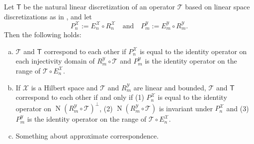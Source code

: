 \documentclass[a4paper]{paper}
\newcommand{\VecSpace}[1]{\mathscr{#1}}
\newcommand{\Op}[1]{\mathcal{#1}}
\newcommand{\DiscOp}[1]{\mathsf{#1}}
\newcommand*{\EXT}[2]{\ensuremath{E_{#1}^{#2}}}
\newcommand*{\REST}[2]{\ensuremath{R_{#1}^{#2}}}
\newcommand*{\PROJ}[2]{\ensuremath{P_{#1}^{#2}}}
\newcommand*{\RnX}{\ensuremath{\REST{n}{\VecSpace{X}}}}
\newcommand*{\RmY}{\ensuremath{\REST{m}{\VecSpace{Y}}}}
\newcommand*{\EnX}{\ensuremath{\EXT{n}{\VecSpace{X}}}}
\newcommand*{\EmY}{\ensuremath{\EXT{m}{\VecSpace{Y}}}}
\newcommand*{\PnX}{\ensuremath{\PROJ{n}{\VecSpace{X}}}}
\newcommand*{\PmY}{\ensuremath{\PROJ{m}{\VecSpace{Y}}}}
\DeclareMathOperator{\nullspace}{N}
\begin{document}
\begin{lemma}
 \label{lemma:nat_op_discr_fulfills_corresp}
 Let $\DiscOp{T}$ be the natural linear discretization of an operator $\Op{T}$ based on linear space discretizations as in 
 , and let
 \begin{equation*}
  \PnX := \EnX \circ \RnX \quad \text{and} \quad \PmY := \EmY \circ \RmY.
 \end{equation*}
 Then the following holds:
 
 \begin{enumerate}[(a)]
  \item \label{lemma:nat_op_discr_fulfills_corresp:a_general}
  $\Op{T}$ and $\DiscOp{T}$ correspond to each other if $\PnX$ is equal to the identity operator on each
  injectivity domain of $\RmY \circ \Op{T}$ and $\PmY$ is the identity operator on the range of $\Op{T} \circ \EnX$.

  \item \label{lemma:nat_op_discr_fulfills_corresp:b_hilbert_linear}
  If $\VecSpace{X}$ is a Hilbert space and $\Op{T}$ and $\RmY$ are linear and bounded, $\Op{T}$ and $\DiscOp{T}$ correspond to each other 
  if and only if (1) $\PnX$ is equal to the identity operator on $\nullspace(\RmY \circ \Op{T})^\perp$, (2) $\nullspace(\RmY \circ \Op{T})$ 
  is invariant under $\PnX$ and (3) $\PmY$ is the identity operator on the range of $\Op{T} \circ \EnX$.
  
  \item Something about approximate correspondence.
 \end{enumerate}
\end{lemma}
\end{document}
